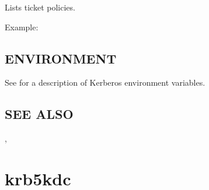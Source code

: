 \documentclass[letterpaper,10pt,english]{sphinxmanual}
\begin{document}
\sphinxAtStartPar
Lists ticket policies.

\sphinxAtStartPar
Example:

\begin{sphinxVerbatim}[commandchars=\\\{\}]
    
      
  
\end{sphinxVerbatim}


\subsection{ENVIRONMENT}
\label{\detokenize{admin/admin_commands/kdb5_ldap_util:environment}}\label{\detokenize{admin/admin_commands/kdb5_ldap_util:kdb5-ldap-util-list-policy-end}}
\sphinxAtStartPar
See  for a description of Kerberos environment
variables.


\subsection{SEE ALSO}
\label{\detokenize{admin/admin_commands/kdb5_ldap_util:see-also}}
\sphinxAtStartPar
{\hyperref[\detokenize{admin/admin_commands/kadmin_local:kadmin-1}]{}}, 

\sphinxstepscope


\section{krb5kdc}
\label{\detokenize{admin/admin_commands/krb5kdc:krb5kdc}}\label{\detokenize{admin/admin_commands/krb5kdc:krb5kdc-8}}\label{\detokenize{admin/admin_commands/krb5kdc::doc}}
\end{document}
